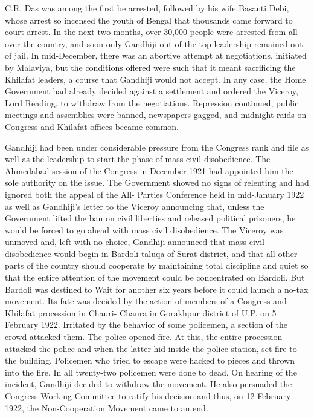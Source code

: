\begin{multicols}{2}
C.R. Das was among the first be arrested, followed by his wife Basanti Debi, whose arrest so incensed the youth of Bengal that thousands came forward to court arrest. In the next two months, over 30,000 people were arrested from all over the country, and soon only Gandhiji out of the top leadership remained out of jail. In mid-December, there was an abortive attempt at negotiations, initiated by Malaviya, but the conditions offered were such that it meant sacrificing the Khilafat leaders, a course that Gandhiji would not accept. In any case, the Home Government had already decided against a settlement and ordered the Viceroy, Lord Reading, to withdraw from the negotiations. Repression continued, public meetings and assemblies were banned, newspapers gagged, and midnight raids on Congress and Khilafat offices became common. 

Gandhiji had been under considerable pressure from the Congress rank and file as well as the leadership to start the phase of mass civil disobedience. The Ahmedabad session of the Congress in December 1921 had appointed him the sole authority on the issue. The Government showed no signs of relenting and had ignored both the appeal of the All- Parties Conference held in mid-January 1922 as well as Gandhiji's letter to the Viceroy announcing that, unless the Government lifted the ban on civil liberties and released political prisoners, he would be forced to go ahead with mass civil disobedience. The Viceroy was unmoved and, left with no choice, Gandhiji announced that mass civil disobedience would begin in Bardoli taluqa of Surat district, and that all other parts of the country should cooperate by maintaining total discipline and quiet so that the entire attention of the movement could be concentrated on Bardoli. But Bardoli was destined to Wait for another six years before it could launch a no-tax movement. Its fate was decided by the action of members of a Congress and Khilafat procession in Chauri- Chaura in Gorakhpur district of U.P. on 5 February 1922. Irritated by the behavior of some policemen, a section of the crowd attacked them. The police opened fire. At this, the entire procession attacked the police and when the latter hid inside the police station, set fire to the building. Policemen who tried to escape were hacked to pieces and thrown into the fire. In all twenty-two policemen were done to dead. On hearing of the incident, Gandhiji decided to withdraw the movement. He also persuaded the Congress Working Committee to ratify his decision and thus, on 12 February 1922, the Non-Cooperation Movement came to an end. 


\end{multicols}
